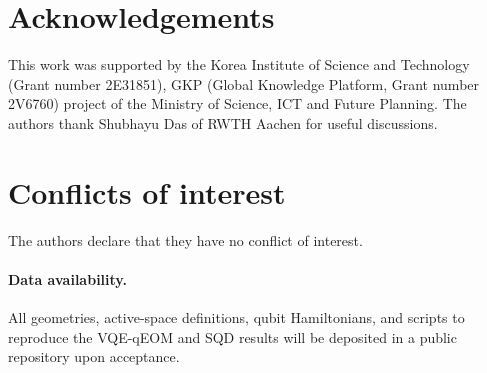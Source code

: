 \documentclass[num-refs]{wiley-article}
\begin{document}
\section*{Acknowledgements}

This work was supported by the Korea Institute of Science and Technology (Grant number 2E31851), GKP (Global Knowledge Platform, Grant number 2V6760) project of the Ministry of Science, ICT and Future Planning. The authors thank Shubhayu Das of RWTH Aachen for useful discussions.

\section*{Conflicts of interest}
The authors declare that they have no conflict of interest.


\paragraph{Data availability.}
All geometries, active-space definitions, qubit Hamiltonians, and scripts to reproduce the VQE-qEOM and SQD results will be deposited in a public repository upon acceptance.


\end{document}
